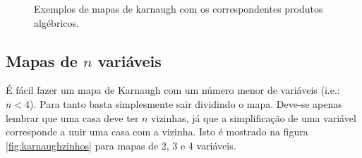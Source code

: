 \begin{figure}[hbtp]
\begin{center}
{}
\caption{Exemplos de mapas de karnaugh com os correspondentes produtos algébricos.}\label{fig:k_exemplos}
\end{center}
\end{figure}
\clearpage

\subsection{Mapas de $n$ variáveis}

É fácil fazer um mapa de Karnaugh com um número menor de variáveis (i.e.: $n<4$). Para tanto basta simplesmente sair dividindo o mapa. Deve-se apenas lembrar que uma casa deve ter $n$ vizinhas, já que a simplificação de uma variável corresponde a unir uma casa com a vizinha. Isto é mostrado na figura \ref{fig:karnaughzinhos} para mapas de 2, 3 e 4 variáveis.

